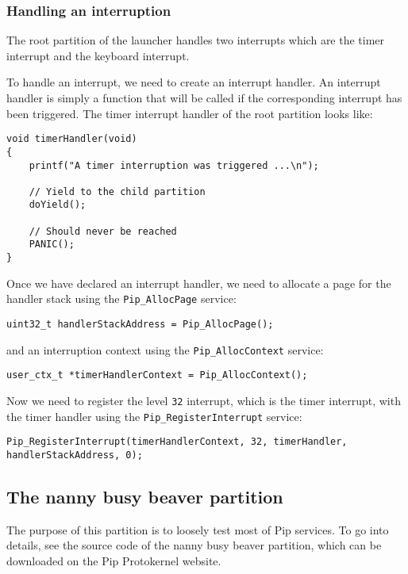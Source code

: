 \documentclass[10pt,a4paper,titlepage]{refart}
\begin{document}
\subsubsection{Handling an interruption}

The root partition of the launcher handles two interrupts which are the timer
interrupt and the keyboard interrupt.

To handle an interrupt, we need to create an interrupt handler. An interrupt
handler is simply a function that will be called if the corresponding interrupt
has been triggered. The timer interrupt handler of the root partition looks
like:

\begin{lstlisting}[style=CStyle]
void timerHandler(void)
{
	printf("A timer interruption was triggered ...\n");

	// Yield to the child partition
	doYield();

	// Should never be reached
	PANIC();
}
\end{lstlisting}

Once we have declared an interrupt handler, we need to allocate a page for the
handler stack using the \texttt{Pip\_AllocPage} service:

\begin{lstlisting}[style=CStyle]
uint32_t handlerStackAddress = Pip_AllocPage();
\end{lstlisting}

and an interruption context using the \texttt{Pip\_AllocContext} service:

\begin{lstlisting}[style=CStyle]
user_ctx_t *timerHandlerContext = Pip_AllocContext();
\end{lstlisting}

Now we need to register the level \texttt{32} interrupt, which is the timer
interrupt, with the timer handler using the \texttt{Pip\_RegisterInterrupt}
service:

\begin{lstlisting}[style=CStyle]
Pip_RegisterInterrupt(timerHandlerContext, 32, timerHandler, handlerStackAddress, 0);
\end{lstlisting}

\subsection{The nanny busy beaver partition}

The purpose of this partition is to loosely test most of Pip services. To go
into details, see the source code of the nanny busy beaver partition, which can
be downloaded on the Pip Protokernel website.
\end{document}
